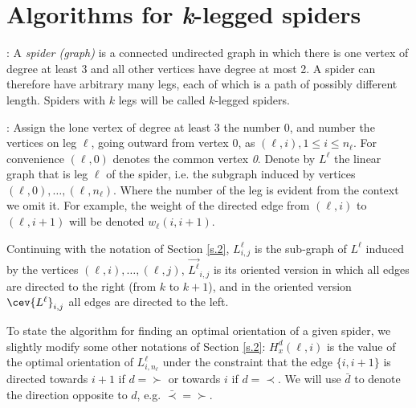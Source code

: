 \section{Algorithms for \textit{k}-legged spiders}\label{s.3}

: A \textit{spider (graph)}  is a connected undirected graph in which 
there is one  vertex of degree at least 3 and all other vertices have degree at most 2.
A spider can therefore have arbitrary many legs, each of which is a path of possibly different length. 
Spiders with $k$ legs will be called $k$-legged spiders. 

: Assign the lone vertex of degree at least 3 the number 0,
and number the vertices on leg $\ell$, going outward from vertex $0$, as $(\ell,i), 1\leq i \leq n_\ell$.
For convenience  $(\ell,0)$ denotes the common vertex \textit{0}. Denote by $L^{\ell}$ the linear graph
that is leg $\ell$ of the spider, i.e. the subgraph induced by vertices $(\ell,0),\ldots, (\ell,n_{\ell})$.
Where the number of the leg is evident from the context we omit it.
For example, the weight of the directed edge from $(\ell,i)$ to $(\ell,i+1)$ will be denoted
$w_{\ell}(i,i+1)$.

Continuing with the notation of Section \ref{s.2}, 
$L^{\ell}_{i, j}$ is the sub-graph of $L^{\ell}$ induced by the vertices $(\ell,i),  \ldots, (\ell,j)$,
$\vec{L^{\ell}}_{i, j}$ is its oriented version in which all edges are directed to the right 
(from $k$ to $k+1$),
and in the oriented version $\cev{L^{\ell}}_{i, j}$ all edges are directed to the left. 

To state the algorithm for finding an optimal orientation of a given spider, we slightly modify some other notations of Section \ref{s.2}: 
$H^{d}_x(\ell,i)$ is the value of the optimal orientation of $L^{\ell}_{i,n_\ell}$
under the constraint that the edge $\{i,i+1\}$ is directed towards $i+1$ if $d=\succ$ or 
towards $i$ if $d=\prec$. We will use $\bar{d}$ to denote the direction opposite to $d$, e.g.
$\bar{\prec}=\succ$.

